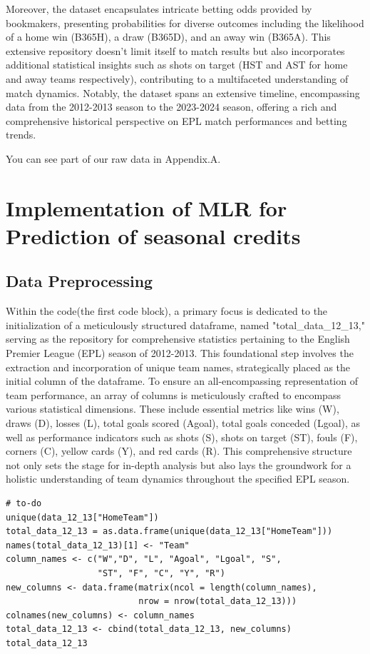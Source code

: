 \documentclass[12pt]{article}
\begin{document}
Moreover, the dataset encapsulates intricate betting odds provided by bookmakers, presenting probabilities for diverse outcomes including the likelihood of a home win (B365H), a draw (B365D), and an away win (B365A). This extensive repository doesn't limit itself to match results but also incorporates additional statistical insights such as shots on target (HST and AST for home and away teams respectively), contributing to a multifaceted understanding of match dynamics. Notably, the dataset spans an extensive timeline, encompassing data from the 2012-2013 season to the 2023-2024 season, offering a rich and comprehensive historical perspective on EPL match performances and betting trends.

You can see part of our raw data in Appendix.A.
\section{Implementation of MLR for Prediction of seasonal credits}

\subsection{Data Preprocessing}

Within the code(the first code block), a primary focus is dedicated to the initialization of a meticulously structured dataframe, named "total\_data\_12\_13," serving as the repository for comprehensive statistics pertaining to the English Premier League (EPL) season of 2012-2013. This foundational step involves the extraction and incorporation of unique team names, strategically placed as the initial column of the dataframe. To ensure an all-encompassing representation of team performance, an array of columns is meticulously crafted to encompass various statistical dimensions. These include essential metrics like wins (W), draws (D), losses (L), total goals scored (Agoal), total goals conceded (Lgoal), as well as performance indicators such as shots (S), shots on target (ST), fouls (F), corners (C), yellow cards (Y), and red cards (R). This comprehensive structure not only sets the stage for in-depth analysis but also lays the groundwork for a holistic understanding of team dynamics throughout the specified EPL season.

\begin{lstlisting}
# to-do
unique(data_12_13["HomeTeam"])
total_data_12_13 = as.data.frame(unique(data_12_13["HomeTeam"]))
names(total_data_12_13)[1] <- "Team"
column_names <- c("W","D", "L", "Agoal", "Lgoal", "S", 
                  "ST", "F", "C", "Y", "R")
new_columns <- data.frame(matrix(ncol = length(column_names), 
                          nrow = nrow(total_data_12_13)))
colnames(new_columns) <- column_names
total_data_12_13 <- cbind(total_data_12_13, new_columns)
total_data_12_13
\end{lstlisting}
\end{document}
